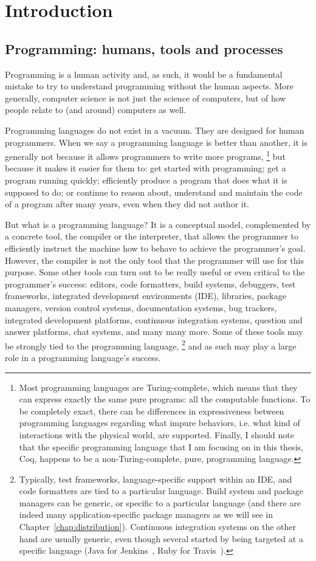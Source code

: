 \chapter{Introduction}

\section{Programming: humans, tools and processes}

Programming is a human activity and, as such, it would be a fundamental mistake to try to understand programming without the human aspects.
More generally, computer science is not just the science of computers, but of how people relate to (and around) computers as well.

Programming languages do not exist in a vacuum.  They are designed for human programmers.
When we say a programming language is better than another, it is generally not because it allows programmers to write more programs,%
\footnote{
	Most programming languages are Turing-complete, which means that they can express exactly the same pure programs: all the computable functions.
	To be completely exact, there can be differences in expressiveness between programming languages regarding what impure behaviors, i.e. what kind of interactions with the physical world, are supported.
	Finally, I should note that the specific programming language that I am focusing on in this thesis, Coq, happens to be a non-Turing-complete, pure, programming language.
} but because it makes it easier for them to: get started with programming; get a program running quickly; efficiently produce a program that does what it is supposed to do; or continue to reason about, understand and maintain the code of a program after many years, even when they did not author it.

But what is a programming language?
It is a conceptual model, complemented by a concrete tool, the compiler or the interpreter, that allows the programmer to efficiently instruct the machine how to behave to achieve the programmer's goal.
However, the compiler is not the only tool that the programmer will use for this purpose.
Some other tools can turn out to be really useful or even critical to the programmer's success: editors, code formatters, build systems, debuggers, test frameworks, integrated development environments (IDE), libraries, package managers, version control systems, documentation systems, bug trackers, integrated development platforms, continuous integration systems, question and answer platforms, chat systems, and many many more.
Some of these tools may be strongly tied to the programming language,%
\footnote{
	Typically, test frameworks, language-specific support within an IDE, and code formatters are tied to a particular language.
	Build system and package managers can be generic, or specific to a particular language (and there are indeed many application-specific package managers as we will see in Chapter~\ref{chap:distribution}).
	Continuous integration systems on the other hand are usually generic, even though several started by being targeted at a specific language (Java for Jenkins~\cite{jenkins}, Ruby for Travis~\cite{travisci}).
}
and as such may play a large role in a programming language's success.

